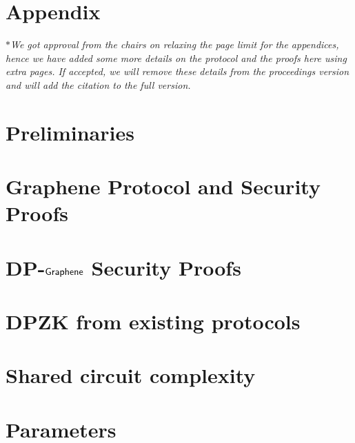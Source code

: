 \documentclass[USenglish,oneside,twocolumn]{article}
\begin{document}



%
\appendix
\section*{Appendix}
\textit{$\ast$We got approval from the chairs on relaxing the page limit for the appendices, hence we have added some more details on the protocol and the proofs here using extra pages. If accepted, we will remove these details from the proceedings version and will add the citation to the full version.}
%
\section{Preliminaries}
\label{app:securitydef}

\section{Graphene Protocol and Security Proofs}
\label{app:grapehene_securityproofs}

\section{DP-$\textsf{Graphene}$ Security Proofs}
\label{app:dp_grapehene_securityproofs}

\section{DPZK from existing protocols}
\label{app:dpzk_others}

\section{Shared circuit complexity}
\label{app:shared_ciruit}

\section{Parameters}
\label{app:Parameters}

\section*{ }
\label{app:DP_Protocols}

\end{document}
